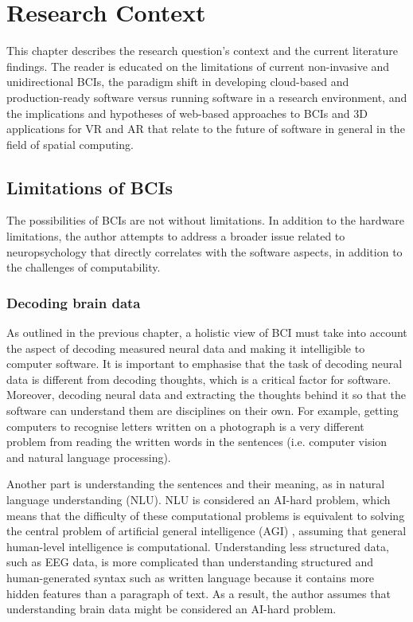 \chapter{Research Context}
\graphicspath{{Chapter2/Figs/}{Chapter2/Figs/}}

This chapter describes the research question's context and the current literature findings. The reader is educated on the limitations of current non-invasive and unidirectional BCIs, the paradigm shift in developing cloud-based and production-ready software versus running software in a research environment, and the implications and hypotheses of web-based approaches to BCIs and 3D applications for VR and AR that relate to the future of software in general in the field of spatial computing.

\section{Limitations of BCIs}
\label{chapter2-limitations-of-bcis}

The possibilities of BCIs are not without limitations. In addition to the hardware limitations, the author attempts to address a broader issue related to neuropsychology that directly correlates with the software aspects, in addition to the challenges of computability.

\subsection{Decoding brain data}
\label{chapter2-decoding-brain-data}

As outlined in the previous chapter, a holistic view of BCI must take into account the aspect of decoding measured neural data and making it intelligible to computer software. It is important to emphasise that the task of decoding neural data is different from decoding thoughts, which is a critical factor for software. Moreover, decoding neural data and extracting the thoughts behind it so that the software can understand them are disciplines on their own. For example, getting computers to recognise letters written on a photograph is a very different problem from reading the written words in the sentences (i.e. computer vision and natural language processing).

Another part is understanding the sentences and their meaning, as in natural language understanding (NLU). NLU is considered an AI-hard problem, which means that the difficulty of these computational problems is equivalent to solving the central problem of artificial general intelligence (AGI) \citep{demasi_theoretical_2010}, assuming that general human-level intelligence is computational. Understanding less structured data, such as EEG data, is more complicated than understanding structured and human-generated syntax such as written language because it contains more hidden features than a paragraph of text. As a result, the author assumes that understanding brain data might be considered an AI-hard problem.

